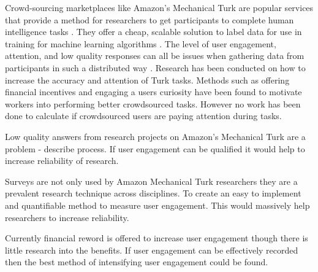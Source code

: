 \documentclass{article}
\begin{document}
Crowd-sourcing marketplaces like Amazon’s Mechanical Turk are popular services that provide a method for researchers to get participants to complete human intelligence tasks \cite{paolacci2010running}. 
They offer a cheap, scalable solution to label data for use in training for machine learning algorithms \cite{chang2017revolt}.
The level of user engagement, attention, and low quality responses can all be issues when gathering data from participants in such a distributed way \cite{ipeirotis2010quality}. 
Research has been conducted on how to increase the accuracy and attention of Turk tasks.
Methods such as offering financial incentives \cite{ho2015incentivizing} and engaging a users curiosity \cite{law2016curiosity} have been found to motivate workers into performing better crowdsourced tasks. 
However no work has been done to calculate if crowdsourced users are paying attention during tasks. 

Low quality answers from research projects on Amazon's Mechanical Turk are a problem - describe process.
If user engagement can be qualified it would help to increase reliability of research.

Surveys are not only used by Amazon Mechanical Turk researchers they are a prevalent research technique across disciplines.
To create an easy to implement and quantifiable method to measure user engagement.
This would massively help researchers to increase reliability.

Currently financial reword is offered to increase user engagement though there is little research into the benefits.
If user engagement can be effectively recorded then the best method of intensifying user engagement could be found.

\end{document}
